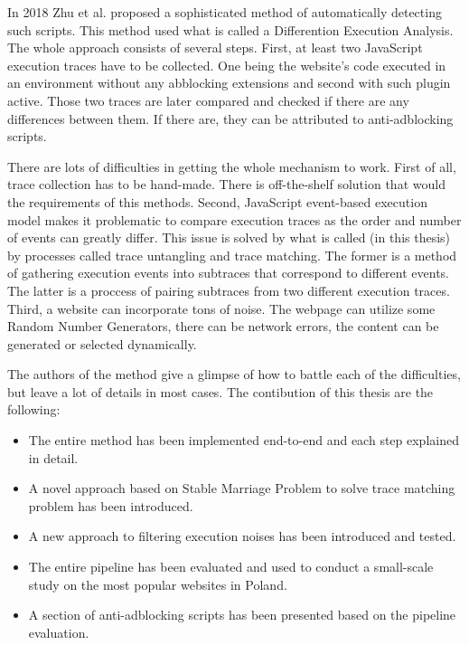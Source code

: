 In 2018 Zhu et al. \cite{DBLP:conf/ndss/ZhuHQSY18} proposed a sophisticated method of automatically detecting such
scripts. This method used what is called a Differention Execution Analysis. The whole approach consists of several steps.
First, at least two JavaScript execution traces have to be collected. One being the website's code executed
in an environment without any abblocking extensions and second with such plugin active.
Those two traces are later compared and checked if there are any differences between them.
If there are, they can be attributed to anti-adblocking scripts.

There are lots of difficulties in getting the whole mechanism to work. First of all, trace collection has
to be hand-made. There is off-the-shelf solution that would the requirements of this methods.
Second, JavaScript event-based execution model makes it problematic to compare execution traces
as the order and number of events can greatly differ. This issue is solved by what is called (in this thesis)
by processes called trace untangling and trace matching. The former is a method of gathering 
execution events into subtraces that correspond to different events. The latter is a proccess of
pairing subtraces from two different execution traces.
Third, a website can incorporate tons of noise. The webpage can utilize some Random Number Generators, 
there can be network errors, the content can be generated or selected dynamically.

The authors of the method give a glimpse of how to battle each of the difficulties, but leave a lot of details 
in most cases. The contibution of this thesis are the following:
\begin{itemize}
  \item The entire method has been implemented end-to-end and each step explained in detail.
  \item A novel approach based on Stable Marriage Problem to solve trace matching problem
           has been introduced.
  \item A new approach to filtering execution noises has been introduced and tested.
  \item The entire pipeline has been evaluated and used to conduct a small-scale study on the most
           popular websites in Poland.
  \item A section of anti-adblocking scripts has been presented based on the pipeline evaluation.
\end{itemize}

